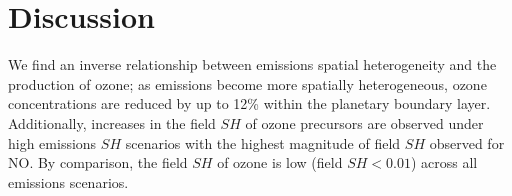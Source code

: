 
  
\section{Discussion}

We find an inverse relationship between emissions spatial heterogeneity and the production of ozone; as emissions become more spatially heterogeneous, ozone concentrations are reduced by up to 12\% within the planetary boundary layer. Additionally, increases in the field $SH$ of ozone precursors are observed under high emissions $SH$ scenarios with the highest magnitude of field $SH$ observed for NO. By comparison, the field $SH$ of ozone is low (field $SH<0.01$) across all emissions scenarios. 


